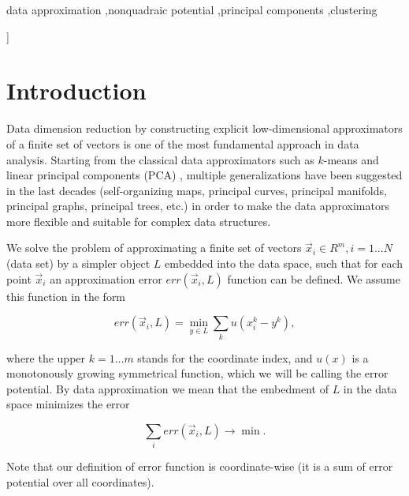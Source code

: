 \documentclass[preprint,12pt,twocolumn]{elsarticle}
\begin{document}
{\begin{frontmatter}
\begin{keyword}
data approximation \sep nonquadraic potential \sep principal components \sep clustering


\end{keyword}

\end{frontmatter}

}]


\section{Introduction}
\label{S:1}

Data dimension reduction by constructing explicit low-dimensional approximators of a finite set of vectors is one of the most fundamental approach in data analysis. Starting from the classical data approximators such as $k$-means \cite{Lloyd1957} and linear principal components (PCA) \cite{Pearson1901On}, multiple generalizations have been suggested in the last decades (self-organizing maps, principal curves, principal manifolds, principal graphs, principal trees, etc.)\cite{Gorban2009,Gorban2008Principal} in order to make the data approximators more flexible and suitable for complex data structures.

We solve the problem of approximating a finite set of vectors ${\vec{x}_i}\in R^m,i=1...N$ (data set) by a simpler object $L$ embedded into the data space, such that for each point $\vec{x}_i$ an approximation error $err(\vec{x}_i,L)$ function can be defined. We assume this function in the form

\begin{equation}\label{distance_function}
err(\vec{x}_i,L) = \min_{y\in L} \sum_k u(x_i^k-y^k),
\end{equation}

\noindent where the upper $k=1...m$ stands for the coordinate index, and $u(x)$ is a monotonously growing symmetrical function, which we will be calling the error potential. By data approximation we mean that the embedment of $L$ in the data space minimizes the error

$$
\sum_i err(\vec{x}_i,L) \rightarrow \min.
$$

Note that our definition of error function is coordinate-wise (it is a sum of error potential over all coordinates).
\end{document}
